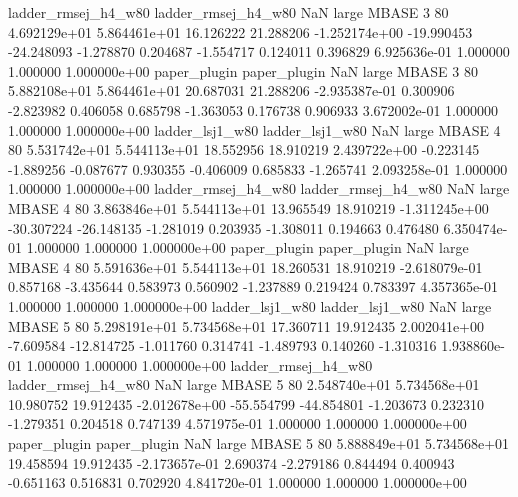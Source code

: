 ladder_rmsej_h4_w80 ladder_rmsej_h4_w80                   NaN      large    MBASE                 3 80 4.692129e+01   5.864461e+01     16.126222      21.288206 -1.252174e+00    -19.990453    -24.248093    -1.278870       0.204687 -1.554717   0.124011     0.396829   6.925636e-01            1.000000        1.000000        1.000000e+00
       paper_plugin        paper_plugin                   NaN      large    MBASE                 3 80 5.882108e+01   5.864461e+01     20.687031      21.288206 -2.935387e-01      0.300906     -2.823982     0.406058       0.685798 -1.363053   0.176738     0.906933   3.672002e-01            1.000000        1.000000        1.000000e+00
    ladder_lsj1_w80     ladder_lsj1_w80                   NaN      large    MBASE                 4 80 5.531742e+01   5.544113e+01     18.552956      18.910219  2.439722e+00     -0.223145     -1.889256    -0.087677       0.930355 -0.406009   0.685833    -1.265741   2.093258e-01            1.000000        1.000000        1.000000e+00
ladder_rmsej_h4_w80 ladder_rmsej_h4_w80                   NaN      large    MBASE                 4 80 3.863846e+01   5.544113e+01     13.965549      18.910219 -1.311245e+00    -30.307224    -26.148135    -1.281019       0.203935 -1.308011   0.194663     0.476480   6.350474e-01            1.000000        1.000000        1.000000e+00
       paper_plugin        paper_plugin                   NaN      large    MBASE                 4 80 5.591636e+01   5.544113e+01     18.260531      18.910219 -2.618079e-01      0.857168     -3.435644     0.583973       0.560902 -1.237889   0.219424     0.783397   4.357365e-01            1.000000        1.000000        1.000000e+00
    ladder_lsj1_w80     ladder_lsj1_w80                   NaN      large    MBASE                 5 80 5.298191e+01   5.734568e+01     17.360711      19.912435  2.002041e+00     -7.609584    -12.814725    -1.011760       0.314741 -1.489793   0.140260    -1.310316   1.938860e-01            1.000000        1.000000        1.000000e+00
ladder_rmsej_h4_w80 ladder_rmsej_h4_w80                   NaN      large    MBASE                 5 80 2.548740e+01   5.734568e+01     10.980752      19.912435 -2.012678e+00    -55.554799    -44.854801    -1.203673       0.232310 -1.279351   0.204518     0.747139   4.571975e-01            1.000000        1.000000        1.000000e+00
       paper_plugin        paper_plugin                   NaN      large    MBASE                 5 80 5.888849e+01   5.734568e+01     19.458594      19.912435 -2.173657e-01      2.690374     -2.279186     0.844494       0.400943 -0.651163   0.516831     0.702920   4.841720e-01            1.000000        1.000000        1.000000e+00

